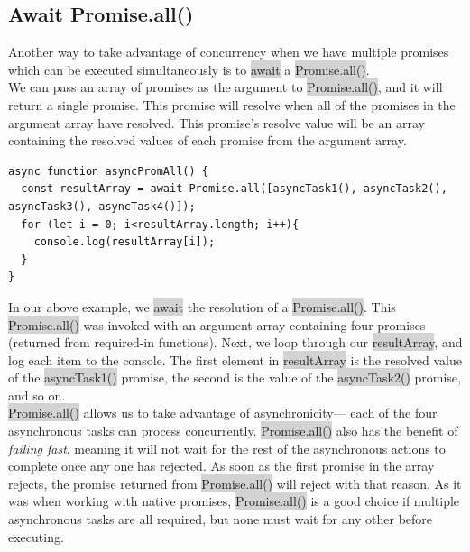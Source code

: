 \documentclass[11pt]{article}
\begin{document}
\subsection{Await Promise.all()}
Another way to take advantage of concurrency when we have multiple promises which can be executed simultaneously is to \colorbox{lightgray}{await} a \colorbox{lightgray}{Promise.all()}. \\
\newline
We can pass an array of promises as the argument to \colorbox{lightgray}{Promise.all()}, and it will return a single promise. This promise will resolve when all of the promises in the argument array have resolved. This promise’s resolve value will be an array containing the resolved values of each promise from the argument array.
\begin{lstlisting}
async function asyncPromAll() {
  const resultArray = await Promise.all([asyncTask1(), asyncTask2(), asyncTask3(), asyncTask4()]);
  for (let i = 0; i<resultArray.length; i++){
    console.log(resultArray[i]); 
  }
}
\end{lstlisting}
In our above example, we \colorbox{lightgray}{await} the resolution of a \colorbox{lightgray}{Promise.all()}. This \colorbox{lightgray}{Promise.all()} was invoked with an argument array containing four promises (returned from required-in functions). Next, we loop through our \colorbox{lightgray}{resultArray}, and log each item to the console. The first element in \colorbox{lightgray}{resultArray} is the resolved value of the \colorbox{lightgray}{asyncTask1()} promise, the second is the value of the \colorbox{lightgray}{asyncTask2()} promise, and so on. \\
\newline
\colorbox{lightgray}{Promise.all()} allows us to take advantage of asynchronicity— each of the four asynchronous tasks can process concurrently. \colorbox{lightgray}{Promise.all()} also has the benefit of \textit{failing fast}, meaning it will not wait for the rest of the asynchronous actions to complete once any one has rejected. As soon as the first promise in the array rejects, the promise returned from \colorbox{lightgray}{Promise.all()} will reject with that reason. As it was when working with native promises, \colorbox{lightgray}{Promise.all()} is a good choice if multiple asynchronous tasks are all required, but none must wait for any other before executing.
\end{document}
